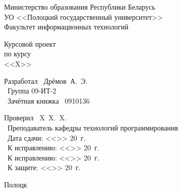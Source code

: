 \documentclass[russian,12pt,utf8,nocolumnsxix,hpadding=5mm]{eskdtext}
\begin{document}

  \begin{titlepage}

    \begin{center}
      Министерство образования Республики Беларусь \\
      \vspace{0.3cm}
      УО <<Полоцкий государственный университет>> \\
      \vspace{0.3cm}
      Факультет информационных технологий
    \end{center}

    \vspace{4em}


    \vspace{9em}

    \begin{center}
      \Large Курсовой проект \\ 
      по курсу \\ 
      <<X>>
    \end{center}

    \vspace{6em}

    \begin{flushleft}
      Разработал \hfill\ Дрёмов~А.~Э. \\
      \hfill\ Группа 09-ИТ-2 \\
      \hfill\ Зачётная книжка \textnumero\ 0910136 \\
      \vspace{1.5em}

      Проверил \hfill\ X~X.~X. \\
      \hfill\ Преподаватель кафедры технологий программирования \\
      \hfill\ Дата сдачи: <<\underline{\hspace{0.4cm}}>> \underline{\hspace{2cm}} 20\underline{\hspace{0.4cm}}~г. \\
      \hfill\ К исправлению: <<\underline{\hspace{0.4cm}}>> \underline{\hspace{2cm}} 20\underline{\hspace{0.4cm}}~г. \\
      \hfill\ К исправлению: <<\underline{\hspace{0.4cm}}>> \underline{\hspace{2cm}} 20\underline{\hspace{0.4cm}}~г. \\
      \hfill\ К защите: <<\underline{\hspace{0.4cm}}>> \underline{\hspace{2cm}} 20\underline{\hspace{0.4cm}}~г.
    \end{flushleft}

    \vspace{\fill}

    \begin{center}
      Полоцк \\ 
      \the\year
    \end{center}

  \end{titlepage}
\end{document}
